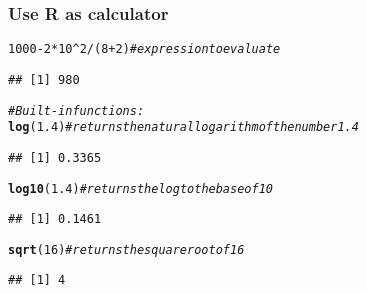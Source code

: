 \documentclass{beamer}\usepackage[]{graphicx}\usepackage[]{color}
\makeatletter
\newcommand{\hlnum}[1]{\textcolor[rgb]{0.686,0.059,0.569}{#1}}%
\newcommand{\hlcom}[1]{\textcolor[rgb]{0.678,0.584,0.686}{\textit{#1}}}%
\newcommand{\hlopt}[1]{\textcolor[rgb]{0,0,0}{#1}}%
\newcommand{\hlstd}[1]{\textcolor[rgb]{0.345,0.345,0.345}{#1}}%
\newcommand{\hlkwd}[1]{\textcolor[rgb]{0.737,0.353,0.396}{\textbf{#1}}}%
\newenvironment{kframe}{%
 \def\at@end@of@kframe{}%
 \ifinner\ifhmode%
  \def\at@end@of@kframe{\end{minipage}}%
  \begin{minipage}{\columnwidth}%
 \fi\fi%
 \def\FrameCommand##1{\hskip\@totalleftmargin \hskip-\fboxsep
 \colorbox{shadecolor}{##1}\hskip-\fboxsep
     \hskip-\linewidth \hskip-\@totalleftmargin \hskip\columnwidth}%
 \MakeFramed {\advance\hsize-\width
   \@totalleftmargin\z@ \linewidth\hsize
   \@setminipage}}%
 {\par\unskip\endMakeFramed%
 \at@end@of@kframe}
\newenvironment{knitrout}{}{} %
\makeatother
\begin{document}
\begin{frame}[fragile]\frametitle{Use R as calculator}
\begin{knitrout}
\color{fgcolor}\begin{kframe}
\begin{alltt}
\hlnum{1000} \hlopt{-} \hlnum{2} \hlopt{*} \hlnum{10}\hlopt{^}\hlnum{2}\hlopt{/}\hlstd{(}\hlnum{8} \hlopt{+} \hlnum{2}\hlstd{)}  \hlcom{#expression to evaluate}
\end{alltt}
\begin{verbatim}
## [1] 980
\end{verbatim}
\begin{alltt}
\hlcom{# Built-in functions:}
\hlkwd{log}\hlstd{(}\hlnum{1.4}\hlstd{)}  \hlcom{#returns the natural logarithm of the number 1.4}
\end{alltt}
\begin{verbatim}
## [1] 0.3365
\end{verbatim}
\begin{alltt}
\hlkwd{log10}\hlstd{(}\hlnum{1.4}\hlstd{)}  \hlcom{# returns the log to the base of 10}
\end{alltt}
\begin{verbatim}
## [1] 0.1461
\end{verbatim}
\begin{alltt}
\hlkwd{sqrt}\hlstd{(}\hlnum{16}\hlstd{)}  \hlcom{#returns the square root of 16}
\end{alltt}
\begin{verbatim}
## [1] 4
\end{verbatim}
\end{kframe}
\end{knitrout}
\end{frame}
\end{document}
